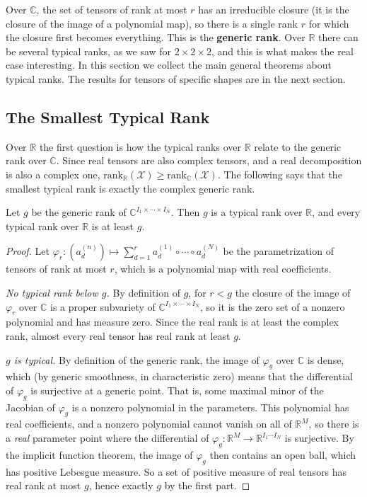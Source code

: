  Over $\mathbb{C}$, the set of tensors of rank at most $r$ has an irreducible closure (it is the closure of the image of a polynomial map), so there is a single rank $r$ for which the closure first becomes everything. This is the \textbf{generic rank}. Over $\mathbb{R}$ there can be several typical ranks, as we saw for $2 \times 2 \times 2$, and this is what makes the real case interesting. In this section we collect the main general theorems about typical ranks. The results for tensors of specific shapes are in the next section.

\subsection{The Smallest Typical Rank}

  Over $\mathbb{R}$ the first question is how the typical ranks over $\mathbb{R}$ relate to the generic rank over $\mathbb{C}$. Since real tensors are also complex tensors, and a real decomposition is also a complex one, $\mathrm{rank}_{\mathbb{R}}(\mathcal{X}) \geq \mathrm{rank}_{\mathbb{C}}(\mathcal{X})$. The following says that the smallest typical rank is exactly the complex generic rank. 

  \begin{theorem}
    \label{thm:smallest-typical}
    Let $g$ be the generic rank of $\mathbb{C}^{I_1 \times \cdots \times I_N}$. Then $g$ is a typical rank over $\mathbb{R}$, and every typical rank over $\mathbb{R}$ is at least $g$. 
  \end{theorem}
  \begin{proof}
    Let $\varphi_r : (a_d^{(n)}) \mapsto \sum_{d=1}^r a_d^{(1)} \circ \cdots \circ a_d^{(N)}$ be the parametrization of tensors of rank at most $r$, which is a polynomial map with real coefficients. 

    \textit{No typical rank below $g$.} By definition of $g$, for $r < g$ the closure of the image of $\varphi_r$ over $\mathbb{C}$ is a proper subvariety of $\mathbb{C}^{I_1 \times \cdots \times I_N}$, so it is the zero set of a nonzero polynomial and has measure zero. Since the real rank is at least the complex rank, almost every real tensor has real rank at least $g$. 

    \textit{$g$ is typical.} By definition of the generic rank, the image of $\varphi_g$ over $\mathbb{C}$ is dense, which (by generic smoothness, in characteristic zero) means that the differential of $\varphi_g$ is surjective at a generic point. That is, some maximal minor of the Jacobian of $\varphi_g$ is a nonzero polynomial in the parameters. This polynomial has real coefficients, and a nonzero polynomial cannot vanish on all of $\mathbb{R}^M$, so there is a \textit{real} parameter point where the differential of $\varphi_g : \mathbb{R}^M \to \mathbb{R}^{I_1 \cdots I_N}$ is surjective. By the implicit function theorem, the image of $\varphi_g$ then contains an open ball, which has positive Lebesgue measure. So a set of positive measure of real tensors has real rank at most $g$, hence exactly $g$ by the first part. 
  \end{proof}

